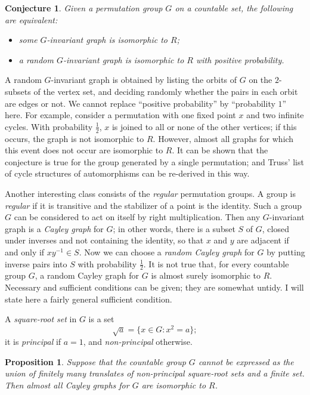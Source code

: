 \documentclass[12pt]{article}
\newtheorem{proposition}{Proposition}
\newtheorem{conjecture}{Conjecture}
\begin{document}
\begin{conjecture}\label{ch32:conj8.1} 
Given a permutation group $G$ on a countable set, the following are equivalent:
\begin{itemize}
\item[(a)] some $G$-invariant graph is isomorphic to $R$;
\item[(b)] a random $G$-invariant graph is isomorphic to $R$ with positive probability.
\end{itemize}
\end{conjecture}

A random $G$-invariant graph is obtained by listing the orbits of
$G$ on the $2$-subsets of the vertex set, and deciding randomly
whether the pairs in each orbit are edges or not. We cannot replace
``positive probability'' by ``probability $1$'' here. For example,
consider a permutation with one fixed point $x$ and two infinite
cycles. With probability $\frac{1}{2}$, $x$ is joined to all or none
of the other vertices; if this occurs, the graph is not isomorphic
to $R$. However, almost all graphs for which this event does not
occur are isomorphic to $R$. It can be shown that the conjecture is
true for the group generated by a single permutation; and Truss'
list of cycle structures of automorphisms can be re-derived in this
way.

Another interesting class consists of the \emph{regular}
permutation groups. A group is \emph{regular} if it is transitive
and the stabilizer of a point is the identity. Such a group $G$ can
be considered to act on itself by right multiplication. Then any
$G$-invariant graph is a \emph{Cayley graph} for $G$; in other
words, there is a subset $S$ of $G$, closed under inverses and not
containing the identity, so that $x$ and $y$ are adjacent if and
only if $xy^{-1}\in S$. Now we can choose a \emph{random Cayley
graph} for $G$ by putting inverse pairs into $S$ with probability
$\frac{1}{2}$. It is not true that, for every countable group $G$, a
random Cayley graph for $G$ is almost surely isomorphic to $R$.
Necessary and sufficient conditions can be given; they are somewhat
untidy. I will state here a fairly general sufficient condition.

A \emph{square-root set} in $G$ is a set
\[
\sqrt{a} = \{x \in G : x^2=a\};
\]
it is \emph{principal} if $a = 1$, and \emph{non-principal}
otherwise.

\begin{proposition}\label{ch32:prop8.3} 
Suppose that the countable group $G$ cannot be
expressed as the union of finitely many translates of non-principal
square-root sets and a finite set. Then almost all Cayley graphs for
$G$ are isomorphic to $R$.
\end{proposition}
\end{document}
